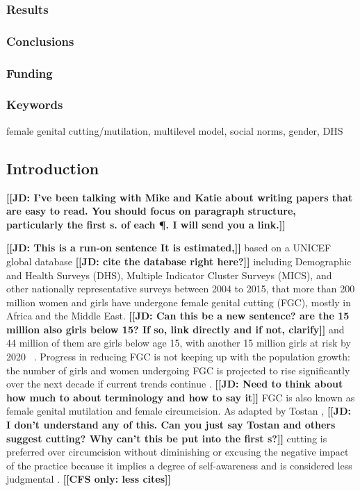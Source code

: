 \documentclass[12pt,]{article}
\newcommand{\comment}[1]{\textbf{[[#1]]}}
\newcommand{\cfonly}[1]{\comment{CFS only: #1}}
\newcommand{\jdcmt}[1]{\comment{JD: #1}}
\begin{document}
\subsubsection{Results}\label{results}

\subsubsection{Conclusions}\label{conclusions}

\subsubsection{Funding}\label{funding}

\subsubsection{Keywords}\label{keywords}

female genital cutting/mutilation, multilevel model, social norms, gender, DHS

\subsection{Introduction}\label{introduction}

\jdcmt{I've been talking with Mike and Katie about writing papers that are easy to read. You should focus on paragraph structure, particularly the first s. of each \P. I will send you a link.}

\jdcmt{This is a run-on sentence It is estimated,} based on a UNICEF global database \jdcmt{cite the database right here?} including Demographic and Health Surveys (DHS), Multiple Indicator Cluster Surveys (MICS),  and other nationally representative surveys between 2004 to 2015, that more than 200 million women and girls have undergone female genital cutting (FGC), mostly in Africa and the Middle East. \jdcmt{Can this be a new sentence? are the 15 million also girls below 15? If so, link directly and if not, clarify} and 44 million of them are girls below age 15, with another 15 million girls at risk by 2020  \cite{AdnrLesc16, UNIC16}.  Progress in reducing FGC is not keeping up with the population growth: the number of girls and women undergoing FGC  is projected to rise significantly over the next decade if current trends continue \cite{KhosBane17, UNIC16}.
\jdcmt{Need to think about how much to about terminology and how to say it} FGC is also known as female genital mutilation and female circumcision.  As adapted by Tostan \cite{Tost15}, \jdcmt{I don't understand any of this. Can you just say Tostan and others suggest cutting? Why can't this be put into the first s?} cutting is preferred over circumcision without diminishing or excusing the negative impact of the practice because it implies a degree of self-awareness and is considered less judgmental  \cite{KhahBark09, JohnEsse10, Meye00, PariSaru18, Shel01, Tost15}. \cfonly{less cites}
\end{document}
